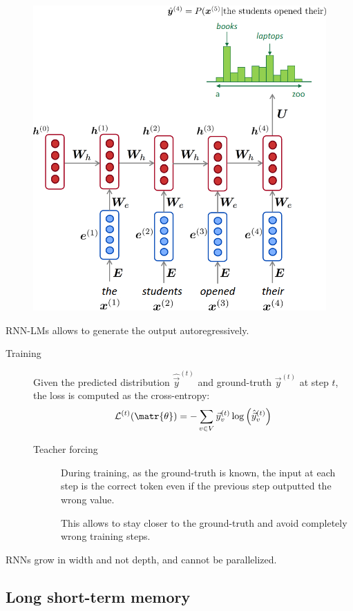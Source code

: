 \begin{description}
    \begin{figure}[H]
        \centering
        \includegraphics[width=0.4\linewidth]{./img/rnn_lm.png}
    \end{figure}

    \begin{remark}
        RNN-LMs allows to generate the output autoregressively.
    \end{remark}

    \begin{description}
        \item[Training]
            Given the predicted distribution $\hat{\vec{y}}^{(t)}$ and ground-truth $\vec{y}^{(t)}$ at step $t$, the loss is computed as the cross-entropy:
            \[ \mathcal{L}^{(t)}(\matr{\theta}) = - \sum_{v \in V} \vec{y}_v^{(t)} \log\left( \hat{\vec{y}}_v^{(t)} \right) \]

            \begin{description}
                \item[Teacher forcing] 
                    During training, as the ground-truth is known, the input at each step is the correct token even if the previous step outputted the wrong value.

                    \begin{remark}
                        This allows to stay closer to the ground-truth and avoid completely wrong training steps.
                    \end{remark}
            \end{description}
    \end{description}
\end{description}

\begin{remark}
    RNNs grow in width and not depth, and cannot be parallelized.
\end{remark}


\subsection{Long short-term memory}

